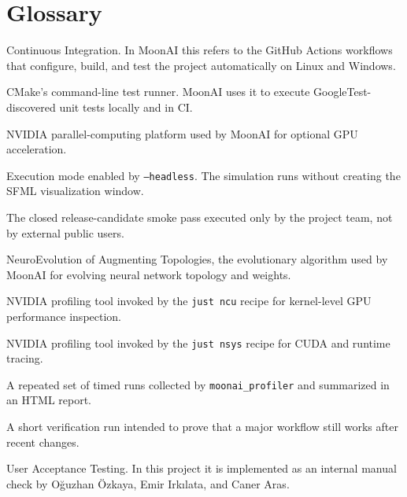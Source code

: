 \section{Glossary}
\label{sec:glossary}

\begin{description}[style=standard,leftmargin=4.2cm,labelwidth=4.0cm,font=\ttfamily\bfseries\small]

	\item[CI]
	      Continuous Integration. In MoonAI this refers to the GitHub Actions workflows that
	      configure, build, and test the project automatically on Linux and Windows.

	\item[CTest]
	      CMake's command-line test runner. MoonAI uses it to execute GoogleTest-discovered unit
	      tests locally and in CI.

	\item[CUDA]
	      NVIDIA parallel-computing platform used by MoonAI for optional GPU acceleration.

	\item[Headless mode]
	      Execution mode enabled by \texttt{--headless}. The simulation runs without creating the
	      SFML visualization window.

	\item[Internal beta]
	      The closed release-candidate smoke pass executed only by the project team, not by
	      external public users.

	\item[NEAT]
	      NeuroEvolution of Augmenting Topologies, the evolutionary algorithm used by MoonAI for
	      evolving neural network topology and weights.

	\item[Nsight Compute]
	      NVIDIA profiling tool invoked by the \texttt{just ncu} recipe for kernel-level GPU
	      performance inspection.

	\item[Nsight Systems]
	      NVIDIA profiling tool invoked by the \texttt{just nsys} recipe for CUDA and runtime
	      tracing.

	\item[Profiler suite]
	      A repeated set of timed runs collected by \texttt{moonai\_profiler} and summarized in an
	      HTML report.

	\item[Smoke test]
	      A short verification run intended to prove that a major workflow still works after recent
	      changes.

	\item[UAT]
	      User Acceptance Testing. In this project it is implemented as an internal manual check by
	      Oğuzhan Özkaya, Emir Irkılata, and Caner Aras.

\end{description}
